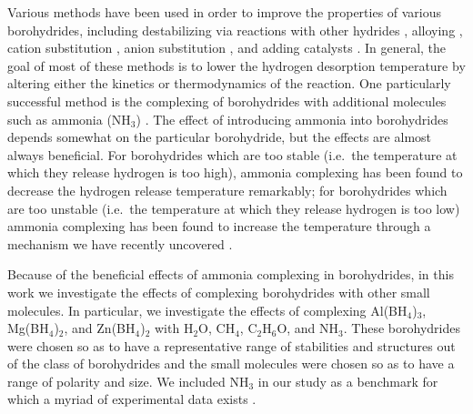 \documentclass[twocolumn, prb, showpacs]{revtex4-1}
\begin{document}
Various methods have been used in order to improve the properties of various
borohydrides, including destabilizing via reactions with other hydrides
\cite{Vajo_2005:reversible_storage, Alapati_2007:using_first,
Alapati_2008:large-scale_screening, Li_2008:dehydriding_rehydriding}, alloying
\cite{Nickels_2008:tuning_decomposition,Li_2007:materials_designing,Lee_2010:effect_mg},
cation substitution \cite{Setten_2007:ab_initio}, anion substitution
\cite{Brinks_2008:adjustment_stability}, and adding catalysts
\cite{Li_2007:effects_ball}.  In general, the goal of most of these methods is
to lower the hydrogen desorption temperature by altering either the kinetics or
thermodynamics of the reaction.  One particularly successful method is the complexing of borohydrides with additional molecules such as
ammonia (NH$_3$) \cite{Chu_2010:structure_hydrogen, Gu_2012:structure_decomposition, Jepsen_2014:boron-nitrogen_based,
Roedern_2015:ammine-stabilized_transition-metal, Sun_2012:new_ammine, Yuan_2012:structure_hydrogenstorage, Welchman_2017:decomposition_mechanisms}.
The effect of introducing ammonia into borohydrides depends somewhat on the
particular borohydride, but the effects are almost always beneficial.  For
borohydrides which are too stable (i.e.\ the temperature at which they release
hydrogen is too high), ammonia complexing has been found to decrease the
hydrogen release temperature remarkably; for borohydrides which are too
unstable (i.e.\ the temperature at which they release
hydrogen is too low) ammonia complexing has been found to increase the
temperature through a mechanism we have recently uncovered
\cite{Welchman_2017:decomposition_mechanisms}.

Because of the beneficial effects of ammonia complexing in borohydrides,
in this work we investigate
the effects of complexing borohydrides with other small molecules. In particular, we
investigate the effects of complexing Al(BH$_4$)$_3$, Mg(BH$_4$)$_2$, and
Zn(BH$_4$)$_2$ with H$_2$O, CH$_4$, C$_2$H$_6$O, and NH$_3$. These borohydrides were
chosen so as to have a representative range of stabilities and structures out
of the class of borohydrides \cite{Nakamori_2007:thermodynamical_stabilities} and the small molecules were chosen so as to have a
range of polarity and size. We included NH$_3$ in our study as a benchmark
for which a myriad of experimental data exists \cite{Chu_2010:structure_hydrogen, Gu_2012:structure_decomposition, Jepsen_2014:boron-nitrogen_based,
Roedern_2015:ammine-stabilized_transition-metal, Sun_2012:new_ammine, Yuan_2012:structure_hydrogenstorage}.
\end{document}
